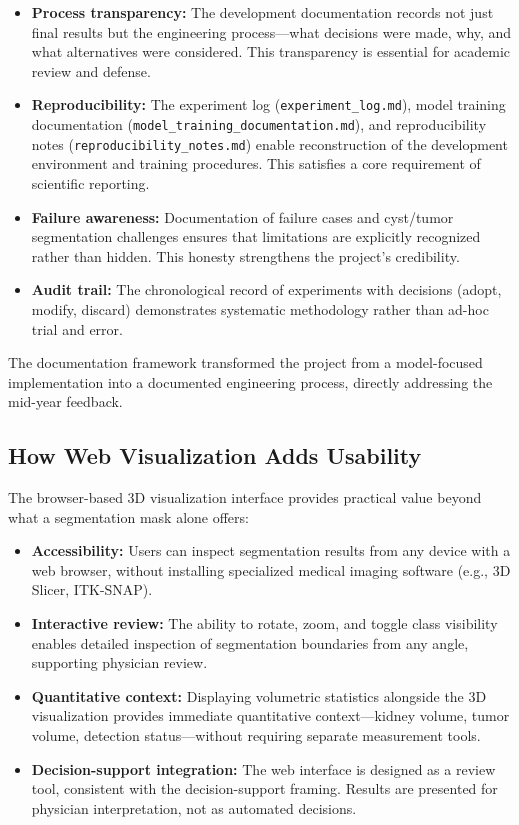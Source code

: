 \begin{itemize}
    \item \textbf{Process transparency:} The development documentation records not just final results but the engineering process---what decisions were made, why, and what alternatives were considered. This transparency is essential for academic review and defense.
    \item \textbf{Reproducibility:} The experiment log (\texttt{experiment\_log.md}), model training documentation (\texttt{model\_training\_documentation.md}), and reproducibility notes (\texttt{reproducibility\_notes.md}) enable reconstruction of the development environment and training procedures. This satisfies a core requirement of scientific reporting.
    \item \textbf{Failure awareness:} Documentation of failure cases and cyst/tumor segmentation challenges ensures that limitations are explicitly recognized rather than hidden. This honesty strengthens the project's credibility.
    \item \textbf{Audit trail:} The chronological record of experiments with decisions (adopt, modify, discard) demonstrates systematic methodology rather than ad-hoc trial and error.
\end{itemize}

The documentation framework transformed the project from a model-focused implementation into a documented engineering process, directly addressing the mid-year feedback.

\subsection{How Web Visualization Adds Usability}

The browser-based 3D visualization interface provides practical value beyond what a segmentation mask alone offers:

\begin{itemize}
    \item \textbf{Accessibility:} Users can inspect segmentation results from any device with a web browser, without installing specialized medical imaging software (e.g., 3D Slicer, ITK-SNAP).
    \item \textbf{Interactive review:} The ability to rotate, zoom, and toggle class visibility enables detailed inspection of segmentation boundaries from any angle, supporting physician review.
    \item \textbf{Quantitative context:} Displaying volumetric statistics alongside the 3D visualization provides immediate quantitative context---kidney volume, tumor volume, detection status---without requiring separate measurement tools.
    \item \textbf{Decision-support integration:} The web interface is designed as a review tool, consistent with the decision-support framing. Results are presented for physician interpretation, not as automated decisions.
\end{itemize}

